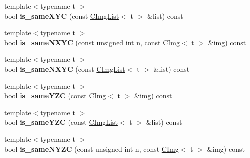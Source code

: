 \begin{DoxyCompactItemize}
\item 
\hypertarget{structcimg__library_1_1CImgList_abb857a12f030051cb3056cc692f2636d}{
{\footnotesize template$<$typename t $>$ }\\bool {\bfseries is\_\-sameXYC} (const \hyperlink{structcimg__library_1_1CImgList}{CImgList}$<$ t $>$ \&list) const }
\label{structcimg__library_1_1CImgList_abb857a12f030051cb3056cc692f2636d}

\item 
\hypertarget{structcimg__library_1_1CImgList_ab5223cb8ea867c6a5b796461723c37ec}{
{\footnotesize template$<$typename t $>$ }\\bool {\bfseries is\_\-sameNXYC} (const unsigned int n, const \hyperlink{structcimg__library_1_1CImg}{CImg}$<$ t $>$ \&img) const }
\label{structcimg__library_1_1CImgList_ab5223cb8ea867c6a5b796461723c37ec}

\item 
\hypertarget{structcimg__library_1_1CImgList_a95caa63e165daec61a424956a7b38d41}{
{\footnotesize template$<$typename t $>$ }\\bool {\bfseries is\_\-sameNXYC} (const \hyperlink{structcimg__library_1_1CImgList}{CImgList}$<$ t $>$ \&list) const }
\label{structcimg__library_1_1CImgList_a95caa63e165daec61a424956a7b38d41}

\item 
\hypertarget{structcimg__library_1_1CImgList_a8c3bd3a2a08f049484197a65f97429c1}{
{\footnotesize template$<$typename t $>$ }\\bool {\bfseries is\_\-sameYZC} (const \hyperlink{structcimg__library_1_1CImg}{CImg}$<$ t $>$ \&img) const }
\label{structcimg__library_1_1CImgList_a8c3bd3a2a08f049484197a65f97429c1}

\item 
\hypertarget{structcimg__library_1_1CImgList_a64d104f910d97162ab03c8b3ebf7e8ba}{
{\footnotesize template$<$typename t $>$ }\\bool {\bfseries is\_\-sameYZC} (const \hyperlink{structcimg__library_1_1CImgList}{CImgList}$<$ t $>$ \&list) const }
\label{structcimg__library_1_1CImgList_a64d104f910d97162ab03c8b3ebf7e8ba}

\item 
\hypertarget{structcimg__library_1_1CImgList_aad75ec7484a76901c297fe3a8cb41902}{
{\footnotesize template$<$typename t $>$ }\\bool {\bfseries is\_\-sameNYZC} (const unsigned int n, const \hyperlink{structcimg__library_1_1CImg}{CImg}$<$ t $>$ \&img) const }
\label{structcimg__library_1_1CImgList_aad75ec7484a76901c297fe3a8cb41902}


\end{DoxyCompactItemize}
